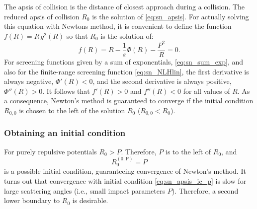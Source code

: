 
The apsis of collision is the distance of closest approach during a collision.
The reduced apsis of collision $R_0$ is the solution of \cref{eq:sn_apsis}.
For actually solving this equation with Newtons method, it is convenient to define the function $f(R) = R \, g^2(R)$ so that $R_0$ is the solution of:
%
\begin{equation}
    \label{eq:sn_apsis_eq}
    f(R) = R - \frac{1}{\varepsilon} \Phi(R) - \frac{P^2}{R} = 0.
\end{equation}
%
For screening functions given by a sum of exponentials, \cref{eq:sn_sum_exp}, and also for the finite-range screening function \cref{eq:sn_NLHlin}, the first derivative is always negative, \(\Phi'(R)<0\), and the second derivative is always positive, \(\Phi''(R)>0\).
It follows that \(f'(R)>0\) and \(f''(R)<0\) for all values of \(R\).
As a consequence, Newton’s method is guaranteed to converge if the initial condition \(R_{0,0}\) is chosen to the left of the solution \(R_0\) (\(R_{0,0} < R_0\)).

\subsubsection{Obtaining an initial condition}
%
For purely repulsive potentials \(R_0 > P\). Therefore, \(P\) is to the left of \(R_0\), and
%
\begin{equation}
    \label{eq:sn_apsis_ic_p}
    R_0^\mathrm{(0,P)} = P
\end{equation}
%
is a possible initial condition, guaranteeing convergence of Newton’s method.
It turns out that convergence with initial condition \cref{eq:sn_apsis_ic_p} is slow for large scattering angles (i.e., small impact parameters $P$).
Therefore, a second lower boundary to $R_0$ is desirable.

